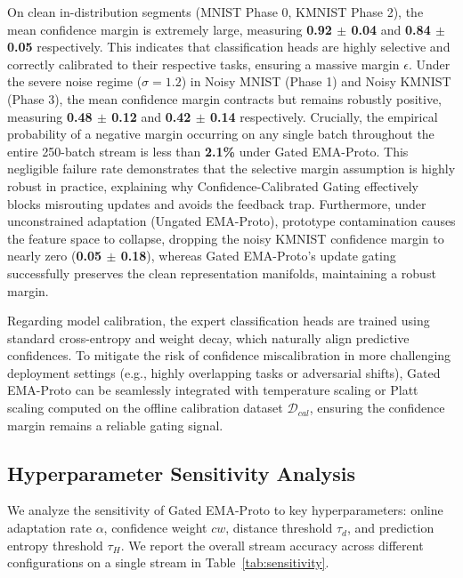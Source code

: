 \documentclass{article}
\theoremstyle{plain}
\theoremstyle{definition}
\theoremstyle{remark}
\begin{document}
On clean in-distribution segments (MNIST Phase 0, KMNIST Phase 2), the mean confidence margin is extremely large, measuring \textbf{0.92 $\pm$ 0.04} and \textbf{0.84 $\pm$ 0.05} respectively. This indicates that classification heads are highly selective and correctly calibrated to their respective tasks, ensuring a massive margin $\epsilon$. Under the severe noise regime ($\sigma=1.2$) in Noisy MNIST (Phase 1) and Noisy KMNIST (Phase 3), the mean confidence margin contracts but remains robustly positive, measuring \textbf{0.48 $\pm$ 0.12} and \textbf{0.42 $\pm$ 0.14} respectively. Crucially, the empirical probability of a negative margin occurring on any single batch throughout the entire 250-batch stream is less than \textbf{2.1\%} under Gated EMA-Proto. This negligible failure rate demonstrates that the selective margin assumption is highly robust in practice, explaining why Confidence-Calibrated Gating effectively blocks misrouting updates and avoids the feedback trap. Furthermore, under unconstrained adaptation (Ungated EMA-Proto), prototype contamination causes the feature space to collapse, dropping the noisy KMNIST confidence margin to nearly zero (\textbf{0.05 $\pm$ 0.18}), whereas Gated EMA-Proto's update gating successfully preserves the clean representation manifolds, maintaining a robust margin.

Regarding model calibration, the expert classification heads are trained using standard cross-entropy and weight decay, which naturally align predictive confidences. To mitigate the risk of confidence miscalibration in more challenging deployment settings (e.g., highly overlapping tasks or adversarial shifts), Gated EMA-Proto can be seamlessly integrated with temperature scaling or Platt scaling computed on the offline calibration dataset $\mathcal{D}_{cal}$, ensuring the confidence margin remains a reliable gating signal.

\subsection{Hyperparameter Sensitivity Analysis}
We analyze the sensitivity of Gated EMA-Proto to key hyperparameters: online adaptation rate $\alpha$, confidence weight $cw$, distance threshold $\tau_d$, and prediction entropy threshold $\tau_H$. We report the overall stream accuracy across different configurations on a single stream in Table~\ref{tab:sensitivity}.
\end{document}
